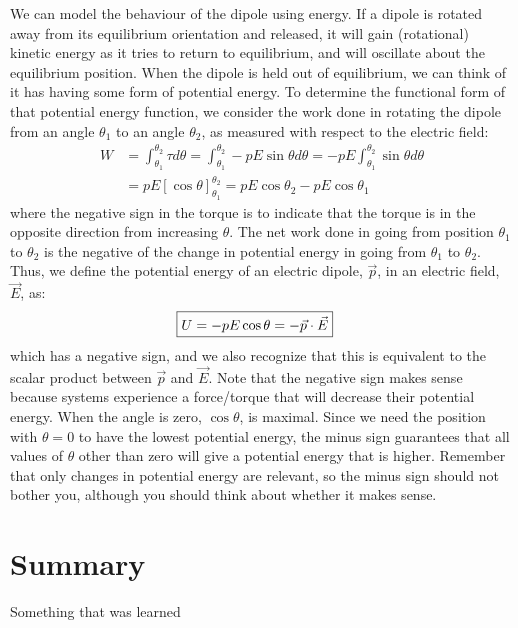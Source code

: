 We can model the behaviour of the dipole using energy. If a dipole is rotated away from its equilibrium orientation and released, it will gain (rotational) kinetic energy as it tries to return to equilibrium, and will oscillate about the equilibrium position. When the dipole is held out of equilibrium, we can think of it has having some form of potential energy. To determine the functional form of that potential energy function, we consider the work done in rotating the dipole from an angle $\theta_1$ to an angle $\theta_2$, as measured with respect to the electric field:
\begin{align*}
W&=\int_{\theta_1}^{\theta_2} \tau d\theta=\int_{\theta_1}^{\theta_2} -pE\sin\theta d\theta=-pE\int_{\theta_1}^{\theta_2} \sin\theta d\theta\\
&=pE[\cos\theta]_{\theta_1}^{\theta_2}=pE\cos\theta_2-pE\cos\theta_1
\end{align*}
where the negative sign in the torque is to indicate that the torque is in the opposite direction from increasing $\theta$. The net work done in going from position $\theta_1$ to $\theta_2$ is the negative of the change in potential energy in going from $\theta_1$ to $\theta_2$. Thus, we define the potential energy of an electric dipole, $\vec p$, in an electric field, $\vec E$, as:
\begin{align*}
\Aboxed{U=-pE\cos\theta=-\vec p\cdot \vec E}
\end{align*}
which has a negative sign, and we also recognize that this is equivalent to the scalar product between $\vec p$ and $\vec E$. Note that the negative sign makes sense because systems experience a force/torque that will decrease their potential energy. When the angle is zero, $\cos\theta$, is maximal. Since we need the position with $\theta=0$ to have the lowest potential energy, the minus sign guarantees that all values of $\theta$ other than zero will give a potential energy that is higher. Remember that only changes in potential energy are relevant, so the minus sign should not bother you, although you should think about whether it makes sense.
\newpage
\section{Summary}

\begin{chapterSummary}
 Something that was learned
\end{chapterSummary}

